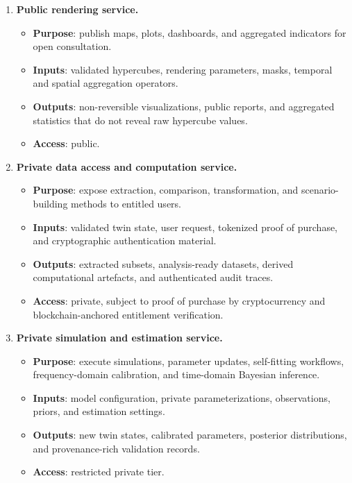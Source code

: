 \begin{enumerate}
\item \textbf{Public rendering service.}
\begin{itemize}
    \item \textbf{Purpose}: publish maps, plots, dashboards, and aggregated indicators for open consultation.
    \item \textbf{Inputs}: validated hypercubes, rendering parameters, masks, temporal and spatial aggregation operators.
    \item \textbf{Outputs}: non-reversible visualizations, public reports, and aggregated statistics that do not reveal raw hypercube values.
    \item \textbf{Access}: public.
\end{itemize}

\item \textbf{Private data access and computation service.}
\begin{itemize}
    \item \textbf{Purpose}: expose extraction, comparison, transformation, and scenario-building methods to entitled users.
    \item \textbf{Inputs}: validated twin state, user request, tokenized proof of purchase, and cryptographic authentication material.
    \item \textbf{Outputs}: extracted subsets, analysis-ready datasets, derived computational artefacts, and authenticated audit traces.
    \item \textbf{Access}: private, subject to proof of purchase by cryptocurrency and blockchain-anchored entitlement verification.
\end{itemize}

\item \textbf{Private simulation and estimation service.}
\begin{itemize}
    \item \textbf{Purpose}: execute simulations, parameter updates, self-fitting workflows, frequency-domain calibration, and time-domain Bayesian inference.
    \item \textbf{Inputs}: model configuration, private parameterizations, observations, priors, and estimation settings.
    \item \textbf{Outputs}: new twin states, calibrated parameters, posterior distributions, and provenance-rich validation records.
    \item \textbf{Access}: restricted private tier.
\end{itemize}


\end{enumerate}
